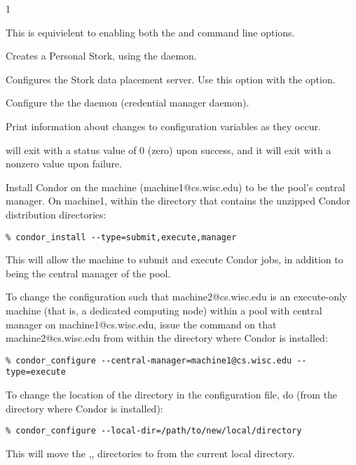 \begin{ManPage}{\label{man-condor-configure}}{1}
\begin{Options}
	 {
	  This is equivielent to enabling both the  and
	   command line options.
	}

	 {Creates a 
	  Personal Stork, using the  daemon.}

	 {Configures the 
	  Stork data placement server.
	  Use this option with the  option.}

	 {Configure the
	  the  daemon (credential manager daemon).}

	 {Print information about changes
	to configuration variables as they occur.}
\end{Options}

\ExitStatus

 will exit with a status value of 0 (zero) upon success,
and it will exit with a nonzero value upon failure.

\Examples
Install Condor on the machine (machine1@cs.wisc.edu)
to be the pool's central manager.
On machine1,
within the directory that contains the unzipped Condor
distribution directories:
\footnotesize
\begin{verbatim}
% condor_install --type=submit,execute,manager
\end{verbatim}
\normalsize
This will allow the machine to submit and execute Condor jobs, 
in addition to being the central manager of the pool.


To change the configuration such that
machine2@cs.wisc.edu is an execute-only machine
(that is, a dedicated computing node)
within a pool with central manager on machine1@cs.wisc.edu,
issue the command on that machine2@cs.wisc.edu
from within the directory where Condor is installed:
\footnotesize
\begin{verbatim}
% condor_configure --central-manager=machine1@cs.wisc.edu --type=execute
\end{verbatim}
\normalsize



To change the location of the  directory
in the configuration file, do (from the directory where Condor is installed):
\footnotesize
\begin{verbatim}
% condor_configure --local-dir=/path/to/new/local/directory
\end{verbatim}
\normalsize
This will move the ,, directories
to  from the current local directory.



\end{ManPage}
